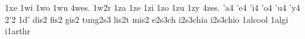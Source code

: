 {1xe                                                                             
1wi                                                                             
1wo                                                                             
1wu                                                                             
4wes.                                                                           
1w2r                                                                            
1za                                                                             
1ze                                                                             
1zi                                                                             
1zo                                                                             
1zu                                                                             
1zy                                                                             
4zes.                                                                           
'a4                                                                             
'e4                                                                             
'i4                                                                             
'o4                                                                             
'u4                                                                             
'y4                                                                             
2'2                                                                             
1d'                                                                             
dis2                                                                            
fis2                                                                            
gis2                                                                            
tung2s3                                                                         
lis2t                                                                           
mis2                                                                            
e2s3ch                                                                          
i2s3chia                                                                        
i2s3chio                                                                        
1alcool                                                                         
1algi                                                                           
i1arthr                                                                         
}
